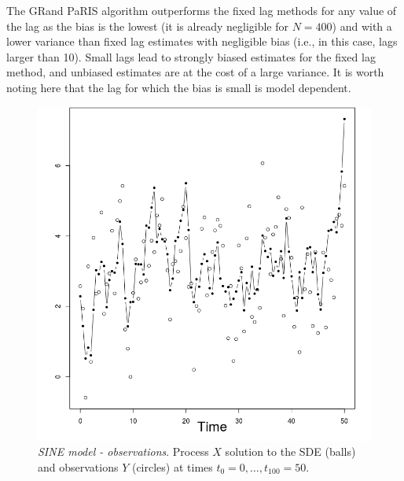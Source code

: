 \documentclass[12pt]{article}
\newcommand{\1}{\mathrm{1}}
\begin{document}
The GRand PaRIS algorithm outperforms the fixed lag methods for any value of the lag as the bias is the lowest (it is already negligible for $N=400$) and with a lower variance than fixed lag estimates with negligible bias (i.e., in this case, lags larger than 10). 
Small lags lead to strongly biased estimates for the fixed lag method, and unbiased estimates are at the cost of a large variance. 
It is worth noting here that the lag for which the bias is small is model dependent. 

\begin{figure}[p]
\centering
\includegraphics[scale = .5]{obs_SINE}
\caption{{\em SINE model - observations}. Process $X$ solution to the SDE (balls) and observations $Y$ (circles) at times $t_0=0,\dots,t_{100}=50$.}
\label{fig:res:SINE:obs}
\end{figure}
\end{document}
